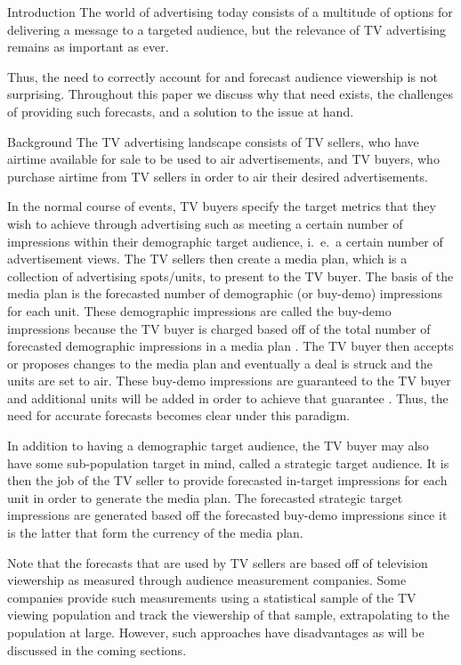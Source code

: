 \begin{chapter}{Introduction}\label{introduction}
  The world of advertising today consists of a multitude of options
  for delivering a message to a targeted audience, but the relevance of TV advertising
  remains as important as ever.

  Thus, the need to correctly account for and forecast audience viewership is not surprising.
  Throughout this paper we discuss why that need exists, the challenges of providing such forecasts,
  and a solution to the issue at hand.

\begin{section}{Background}
  The TV advertising landscape consists of TV sellers, who have airtime available
  for sale to be used to air advertisements, and TV buyers, who purchase airtime
  from TV sellers in order to air their desired advertisements.

  In the normal course of events, TV buyers specify the target metrics that
  they wish to achieve through advertising such as meeting a certain number of impressions within their demographic target audience,
  i.\ e.\ a certain number of advertisement views.
  The TV sellers then create a media plan, which is a collection of advertising spots/units, to present to the TV buyer.
  The basis of the media plan is the forecasted number of demographic (or buy-demo) impressions for each unit.
  These demographic impressions are called the buy-demo impressions because the TV buyer is charged
  based off of the total number of forecasted demographic impressions in a media plan .
  The TV buyer then accepts or proposes changes to the media plan and eventually
  a deal is struck and the units are set to air. These buy-demo impressions are guaranteed to
  the TV buyer and additional units will be added in order to achieve that guarantee \cite{tvforecasting}. Thus, the need
  for accurate forecasts becomes clear under this paradigm.

  In addition to having a demographic target audience, the TV buyer may also have some sub-population
  target in mind, called a strategic target audience. It is then the job of the TV seller to
  provide forecasted in-target impressions for each unit in order to generate the media plan.
  The forecasted strategic target impressions are generated based off the
  forecasted buy-demo impressions since it is the latter
  that form the currency of the media plan.

  Note that the forecasts that are used by TV sellers are based off of
  television viewership as measured through audience measurement companies. Some companies
  provide such measurements
  using a statistical sample of the TV viewing population
  and track the viewership of that sample, extrapolating to the population at large.
  However, such approaches have disadvantages as will be discussed in the coming sections.
\end{section}


\end{chapter}
